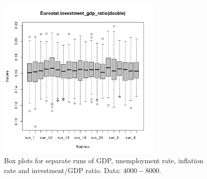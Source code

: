 \begin{figure}[ht!]
\begin{minipage}{17cm}
\includegraphics[width=8cm]{./batch/tax_0.08/Eurostat-investment_gdp_ratio-runbatch.png}
\end{minipage}
\caption{Box plots for separate runs of GDP, unemployment rate, inflation rate and investment/GDP ratio. Data: $4000-8000$.}
\label{Figure: run batch}
\end{figure}
